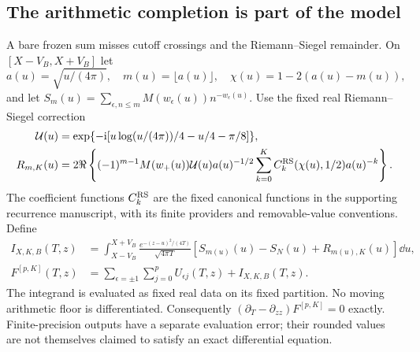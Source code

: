 \subsection{The arithmetic completion is part of the model}
A bare frozen sum misses cutoff crossings and the Riemann--Siegel
remainder. On $[X-V_B,X+V_B]$ let
\[
 a(u)=\sqrt{u/(4\pi)},\quad m(u)=\lfloor a(u)\rfloor,
 \quad\chi(u)=1-2(a(u)-m(u)),
\]
and let $S_m(u)=\sum_{\epsilon,n\le m}M(w_\epsilon(u))n^{-w_\epsilon(u)}$.
Use the fixed real Riemann--Siegel correction
\begin{align*}
 \mathcal U(u)&=\exp\{-\mathrm i[u\log(u/(4\pi))/4-u/4-\pi/8]\},\\
 R_{m,K}(u)&=2\Re\left\{(-1)^{m-1}M(w_+(u))\mathcal U(u)a(u)^{-1/2}
       \sum_{k=0}^K C_k^{\rm RS}(\chi(u),1/2)a(u)^{-k}\right\}.
\end{align*}
The coefficient functions $C_k^{\rm RS}$ are the fixed canonical
functions in the supporting recurrence manuscript, with its finite
providers and removable-value conventions. Define
\begin{align}
 I_{X,K,B}(T,z)&=\int_{X-V_B}^{X+V_B}
 \frac{e^{-(z-u)^2/(4T)}}{\sqrt{4\pi T}}
       [S_{m(u)}(u)-S_N(u)+R_{m(u),K}(u)]\dd u,\\
 F^{[p,K]}(T,z)&=\sum_{\epsilon=\pm1}\sum_{j=0}^p U_{\epsilon j}(T,z)
                     +I_{X,K,B}(T,z).
 \label{eq:negative-completed}
\end{align}
The integrand is evaluated as fixed real data on its fixed partition.
No moving arithmetic floor is differentiated. Consequently
$(\partial_T-\partial_{zz})F^{[p,K]}=0$ exactly. Finite-precision outputs
have a separate evaluation error; their rounded values are not themselves
claimed to satisfy an exact differential equation.

